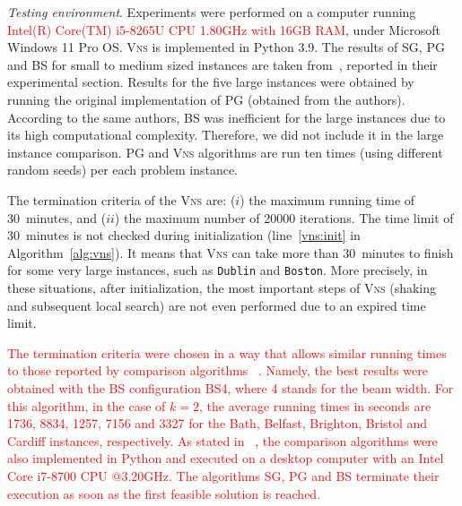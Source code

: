 \documentclass[dvipsnames,format=sigconf]{acmart} %
\begin{document}
 \emph{Testing environment}. Experiments were performed on a computer running \textcolor{red}{Intel(R) Core(TM) i5-8265U CPU  1.80GHz with 16GB RAM}, under Microsoft Windows 11 Pro OS. \textsc{Vns} is implemented in Python 3.9. The results of SG, PG and BS for small to medium sized instances are taken from~\cite{corcoran2021heuristics}, reported in their experimental section. Results for the five large instances were obtained by running the original implementation of PG (obtained from the authors). According to the same authors, BS was inefficient for the large instances due to its high computational complexity. Therefore, we did not include it in the large instance comparison.  
 PG and \textsc{Vns} algorithms are run ten times (using different random seeds) per each problem instance. 
   
  The termination criteria of the \textsc{Vns} are: ($i$) the maximum running time of 30~minutes, and ($ii$) the maximum number of 20000 iterations. The time limit of 30~minutes is not checked during initialization (line~\ref{vns:init} in Algorithm~\ref{alg:vns}). It means that \textsc{Vns} can take more than 30~minutes to finish for some very large instances, such as \texttt{Dublin} and \texttt{Boston}. More precisely, in these situations, after initialization, the most important steps of \textsc{Vns} (shaking and subsequent local search) are not even performed due to an expired time limit.
  
  \textcolor{red}{The termination criteria were chosen in a way that allows similar running times to those reported by comparison algorithms ~\cite{corcoran2021heuristics}. Namely, the best results were obtained with the BS configuration BS4, where 4 stands for the beam width. For this algorithm, in the case of $k=2$, the average running times in seconds are 1736, 8834, 1257, 7156 and 3327 for the Bath, Belfast, Brighton, Bristol and Cardiff instances, respectively.} \textcolor{red}{As stated in ~\cite{corcoran2021heuristics}, the comparison algorithms were also implemented in  Python and executed on a desktop computer with an Intel Core i7-8700 CPU @3.20GHz. The algorithms SG, PG and BS terminate their execution as soon as the first feasible solution is reached.}
   
\end{document}
